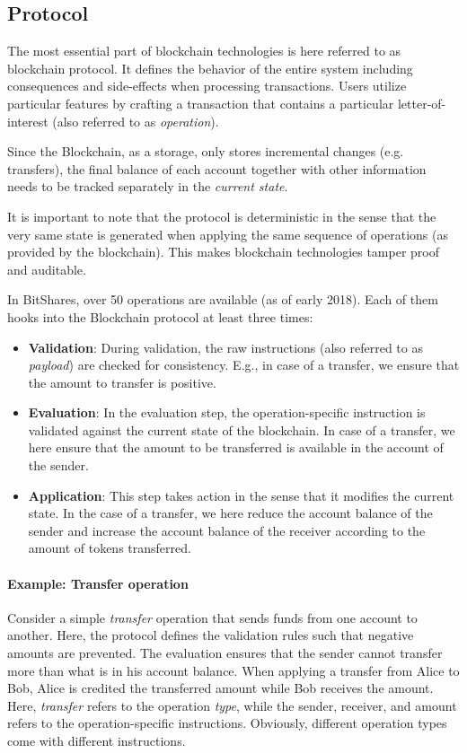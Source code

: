 \subsection{Protocol}
\label{section:architecture:protocol}

The most essential part of blockchain technologies is here referred to as blockchain protocol. It defines the behavior of the entire system including consequences and side-effects when processing transactions. Users utilize particular features by crafting a transaction that contains a particular letter-of-interest (also referred to as \emph{operation}).

Since the Blockchain, as a storage, only stores incremental changes (e.g. transfers), the final balance of each account together with other information needs to be tracked separately in the \emph{current state}.

It is important to note that the protocol is deterministic in the sense that the very same state is generated when applying the same sequence of operations (as provided by the blockchain). This makes blockchain technologies tamper proof and auditable.

In BitShares, over 50 operations are available (as of early 2018). Each of them hooks into the Blockchain protocol at least three times:
\begin{itemize}
\item \textbf{Validation}: During validation, the raw instructions (also referred to as \emph{payload}) are checked for consistency. E.g., in case of a transfer, we ensure that the amount to transfer is positive.
\item \textbf{Evaluation}: In the evaluation step, the operation-specific instruction is validated against the current state of the blockchain. In case of a transfer, we here ensure that the amount to be transferred is available in the account of the sender.
\item \textbf{Application}: This step takes action in the sense that it modifies the current state. In the case of a transfer, we here reduce the account balance of the sender and increase the account balance of the receiver according to the amount of tokens transferred.
\end{itemize}

\paragraph{Example: Transfer operation}
Consider a simple \emph{transfer} operation that sends funds from one account to another. Here, the protocol defines the validation rules such that negative amounts are prevented. The evaluation ensures that the sender cannot transfer more than what is in his account balance. When applying a transfer from Alice to Bob, Alice is credited the transferred amount while Bob receives the amount. Here, \emph{transfer} refers to the operation \emph{type}, while the sender, receiver, and amount refers to the operation-specific instructions. Obviously, different operation types come with different instructions.

